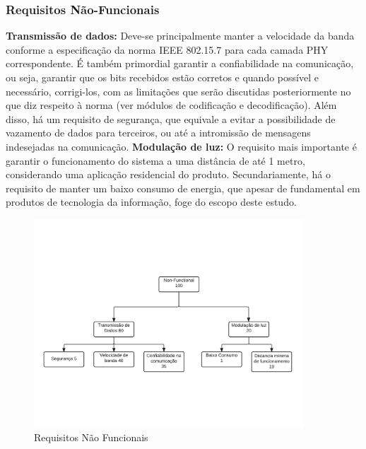 	\subsubsection{Requisitos Não-Funcionais}\label{subsubsec-requisitos-nfunc}
	\textbf{Transmissão de dados:} Deve-se principalmente manter a velocidade da banda conforme a especificação da norma IEEE 802.15.7 para cada camada PHY correspondente. É também primordial garantir a confiabilidade na comunicação, ou seja, garantir que os bits recebidos estão corretos e quando possível e necessário, corrigi-los, com as limitações que serão discutidas posteriormente no que diz respeito à norma (ver módulos de codificação e decodificação). Além disso, há um requisito de segurança, que equivale a evitar a possibilidade de vazamento de dados para terceiros, ou até a intromissão de mensagens indesejadas na comunicação.
	\textbf{Modulação de luz:} O requisito mais importante é garantir o funcionamento do sistema a uma distância de até 1 metro, considerando uma aplicação residencial do produto. Secundariamente, há o requisito de manter um baixo consumo de energia, que apesar de fundamental em produtos de tecnologia da informação, foge do escopo deste estudo.
	
	\begin{figure}[h!]
		\caption{\label{fig_req2} Requisitos Não Funcionais}
		\centering		%
		\includegraphics[width=0.9\textwidth, trim={1cm 5.5cm 1cm 6cm}, clip]{ReqTree2.pdf}
	\end{figure}
	
